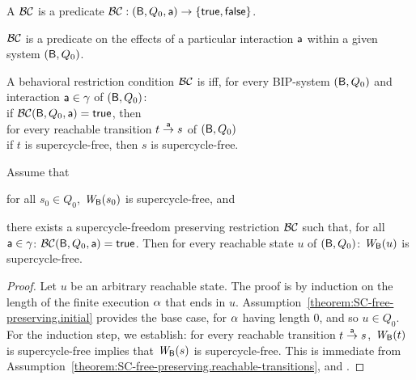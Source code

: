 

\begin{definition}
A  $\BC$ is a predicate
$\BC: (\B, Q_0, \act) \to \set{\ttt, \fff}$.
\end{definition}
%
$\BC$ is a predicate on the effects of a particular interaction $\act$ within a given system
$(\B, Q_0)$.

\begin{definition} \label{def:SC-free-preserving} \label{defn:SC-free-preserving}
A behavioral restriction condition $\BC$ is  iff, for every BIP-system 
$(\B, Q_0)$ and interaction $\act \in \gamma$ of $(\B, Q_0)$: \\
%
\ind if $\BC(\B, Q_0, \act) = \ttt$, then\\
\ind \ind for every reachable transition $t \goesto[\act] s$ of $(\B, Q_0)$\\
\ind \ind \ind if $t$ is supercycle-free, then $s$ is supercycle-free.
\end{definition}


\begin{theorem}
\label{theorem:SC-free-preserving.deadlock-free}
\label{thm:SC-free-preserving.deadlock-free}
Assume that
\bn
\item \label{theorem:SC-free-preserving.initial}
      for all $s_0 \in Q_0$, $\wfg{\B}{s_0}$ is supercycle-free, and
\item \label{theorem:SC-free-preserving.reachable-transitions}
   there exists a supercycle-freedom preserving restriction $\BC$ such that,
   for all $\act \in \gamma$: $\BC(\B, Q_0, \act) = \ttt$. 
\en
Then for every reachable state $u$ of $(\B, Q_0)$:  $\wfg{\B}{u}$ is supercycle-free.
\end{theorem}
%
\begin{proof} Let $u$ be an arbitrary reachable state. The proof is by induction on the length of the finite
execution $\al$ that ends in $u$.  Assumption~\ref{theorem:SC-free-preserving.initial} provides the
base case, for $\al$ having length 0, and so $u \in Q_0$.  For the induction step, we establish: for
every reachable transition $t \la{\act} s$, $\wfg{\B}{t}$ is supercycle-free implies that
$\wfg{\B}{s}$ is supercycle-free. This is immediate from
Assumption~\ref{theorem:SC-free-preserving.reachable-transitions}, and
. 
\end{proof}

